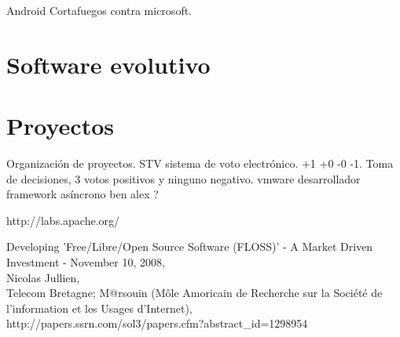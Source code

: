 \documentclass[11pt]{scrartcl}
\begin{document}
Android Cortafuegos contra microsoft.

\section{Software evolutivo}


\section{Proyectos}

Organización de proyectos. STV sistema de voto electrónico. +1 +0 -0 -1.
Toma de decisiones, 3 votos positivos y ninguno negativo.
vmware desarrollador framework asíncrono ben alex ?

http://labs.apache.org/

\begin{thebibliography}{9}

\bibitem{}
    Developing 'Free/Libre/Open Source Software (FLOSS)' - A Market Driven Investment - November 10, 2008,\\
    Nicolas Jullien,\\
    Telecom Bretagne; M@rsouin (M\^ole Amoricain de Recherche sur la Soci\'et\'e de l'information et les Usages d'Internet),\\
    http://papers.ssrn.com/sol3/papers.cfm?abstract\_id=1298954

\end{thebibliography}
\end{document}
